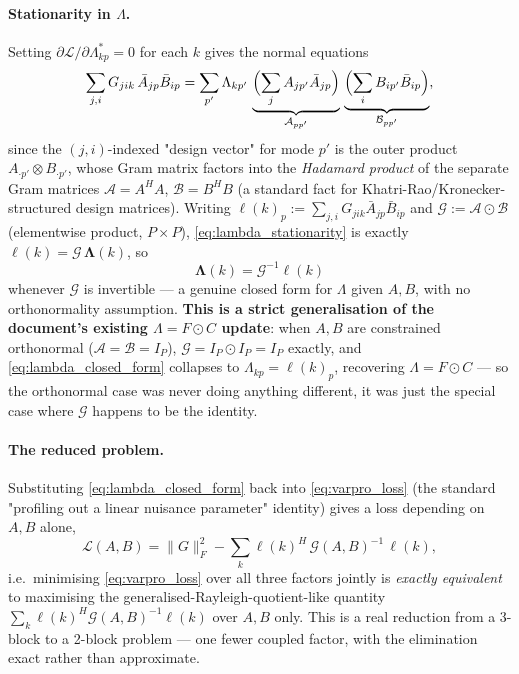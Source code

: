 \documentclass{article}
\begin{document}
\paragraph{Stationarity in $\Lambda$.} Setting $\partial\mathcal{L}/\partial\Lambda^*_{kp}=0$ for
each $k$ gives the normal equations
\begin{equation}
    \sum_{j,i} G_{jik}\,\bar A_{jp}\bar B_{ip} = \sum_{p'} \Lambda_{kp'}\,
        \underbrace{\Bigl(\sum_j A_{jp'}\bar A_{jp}\Bigr)}_{\mathcal{A}_{pp'}}\,
        \underbrace{\Bigl(\sum_i B_{ip'}\bar B_{ip}\Bigr)}_{\mathcal{B}_{pp'}},
    \label{eq:lambda_stationarity}
\end{equation}
since the $(j,i)$-indexed "design vector" for mode $p'$ is the outer product $A_{\cdot p'}\otimes
B_{\cdot p'}$, whose Gram matrix factors into the \emph{Hadamard product} of the separate Gram
matrices $\mathcal{A}=A^HA$, $\mathcal{B}=B^HB$ (a standard fact for Khatri-Rao/Kronecker-structured
design matrices). Writing $\boldsymbol\ell(k)_p := \sum_{j,i}G_{jik}\bar A_{jp}\bar B_{ip}$ and
$\mathcal{G} := \mathcal{A}\odot\mathcal{B}$ (elementwise product, $P\times P$),
\eqref{eq:lambda_stationarity} is exactly $\boldsymbol\ell(k) = \mathcal{G}\,\boldsymbol\Lambda(k)$, so
\begin{equation}
    \boxed{\boldsymbol\Lambda(k) = \mathcal{G}^{-1}\boldsymbol\ell(k)}
    \label{eq:lambda_closed_form}
\end{equation}
whenever $\mathcal{G}$ is invertible — a genuine closed form for $\Lambda$ given $A,B$, with no
orthonormality assumption. \textbf{This is a strict generalisation of the document's existing
$\Lambda=F\odot C$ update}: when $A,B$ are constrained orthonormal ($\mathcal{A}=\mathcal{B}=I_P$),
$\mathcal{G}=I_P\odot I_P=I_P$ exactly, and \eqref{eq:lambda_closed_form} collapses to
$\Lambda_{kp}=\ell(k)_p$, recovering $\Lambda=F\odot C$ — so the orthonormal case was never doing
anything different, it was just the special case where $\mathcal{G}$ happens to be the identity.

\paragraph{The reduced problem.} Substituting \eqref{eq:lambda_closed_form} back into
\eqref{eq:varpro_loss} (the standard "profiling out a linear nuisance parameter" identity)
gives a loss depending on $A,B$ alone,
\begin{equation}
    \mathcal{L}(A,B) = \|G\|_F^2 - \sum_k \boldsymbol\ell(k)^H\,\mathcal{G}(A,B)^{-1}\,\boldsymbol\ell(k),
    \label{eq:varpro_reduced}
\end{equation}
i.e.\ minimising \eqref{eq:varpro_loss} over all three factors jointly is \emph{exactly equivalent}
to maximising the generalised-Rayleigh-quotient-like quantity
$\sum_k\boldsymbol\ell(k)^H\mathcal{G}(A,B)^{-1}\boldsymbol\ell(k)$ over $A,B$ only. This is a real
reduction from a 3-block to a 2-block problem — one fewer coupled factor, with the elimination
exact rather than approximate.
\end{document}
